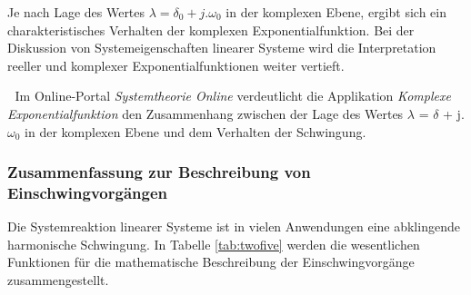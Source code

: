 \noindent Je nach Lage des Wertes $\lambda = \delta{}_{0} + j.\omega{}_{0}$ in der komplexen Ebene, ergibt sich ein charakteristisches Verhalten der komplexen Exponentialfunktion. Bei der Diskussion von Systemeigenschaften linearer Systeme wird die Interpretation reeller und komplexer Exponentialfunktionen weiter vertieft.\newline


\textcolor{white}{.}\newline
\noindent Im Online-Portal \textit{Systemtheorie Online} verdeutlicht die Applikation \textit{Komplexe Exponentialfunktion} den Zusammenhang zwischen der Lage des Wertes $\lambda$ = $\delta$ + j$.$$\omega$${}_{0}$ in der komplexen Ebene und dem Verhalten der Schwingung.


\clearpage


\subsubsection{ Zusammenfassung zur Beschreibung von Einschwingvorg\"{a}ngen}

\noindent Die Systemreaktion linearer Systeme ist in vielen Anwendungen eine abklingende harmonische Schwingung. In Tabelle \ref{tab:twofive} werden die wesentlichen Funktionen für die mathematische Beschreibung der Einschwingvorgänge zusammengestellt.

